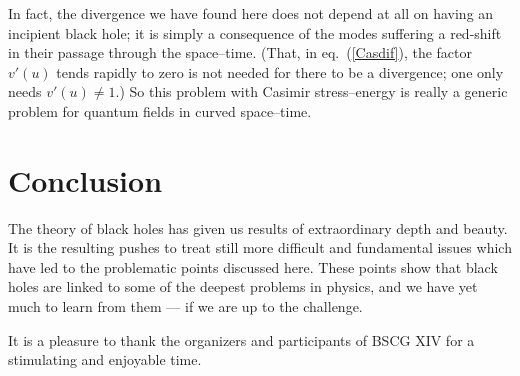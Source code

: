 \documentclass[
%
draft    %
,numberedheadings 
,bibliocites
  ]
  {aipproc}
\begin{document}
In fact, the divergence we have found here
does not depend at all on having an incipient black hole; it is simply a consequence of the modes suffering a red-shift in their passage through the space--time.  (That, in eq.~(\ref{Casdif}), the factor $v'(u)$ tends rapidly to zero is not needed for there to be a divergence; one only needs $v'(u)\not=1$.)  So this problem with Casimir stress--energy is really a generic problem for quantum fields in curved space--time.

\section*{Conclusion}

The theory of black holes has given us results of extraordinary depth and beauty.  It is the resulting pushes to
treat still more difficult and fundamental issues which have led to the problematic points discussed here.  These points show that black holes are linked to some of the deepest problems in physics, and we have yet much to learn from them --- if we are up to the challenge.

\begin{theacknowledgments}
It is a pleasure to thank the organizers and participants of BSCG XIV for a stimulating and enjoyable time.
\end{theacknowledgments}



%
\end{document}
